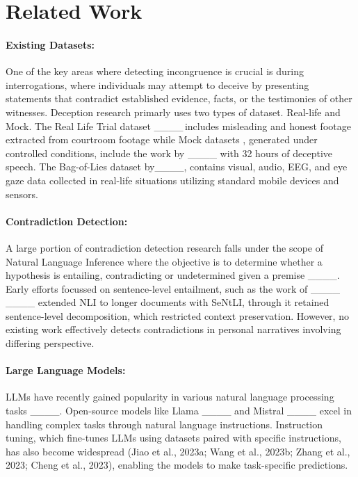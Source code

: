 \section{Related Work}
\paragraph{Existing Datasets:} One of the key areas where detecting incongruence is crucial is during interrogations, where individuals may attempt to deceive by presenting statements that contradict established evidence, facts, or the testimonies of other witnesses. Deception research primarly uses two types of dataset. Real-life and Mock. The Real Life Trial dataset ____\,includes misleading and honest footage extracted from courtroom footage while Mock datasets , generated under controlled conditions, include the work by ____ with 32 hours of deceptive speech.
The Bag-of-Lies dataset by____, contains visual, audio, EEG, and eye gaze data collected in real-life situations utilizing standard mobile devices and sensors.
\vspace{-0.3cm}
\paragraph{Contradiction Detection:} A large portion of contradiction detection research falls under the scope of Natural Language Inference where the objective is to determine whether a hypothesis is entailing, contradicting or undetermined given a premise ____. Early efforts focussed on sentence-level entailment, such as the work of ____ ____ extended NLI to longer documents with SeNtLI, through it retained sentence-level decomposition, which restricted context preservation.
However, no existing work effectively detects contradictions in personal narratives involving differing perspective.
\vspace{-0.3cm}
\paragraph{Large Language Models: } LLMs have recently gained popularity in various natural language processing tasks ____. Open-source models like Llama ____ and Mistral ____ excel in handling complex tasks through natural language instructions. Instruction tuning, which fine-tunes LLMs using datasets paired with specific instructions, has also become widespread (Jiao et al., 2023a; Wang et al., 2023b; Zhang et al., 2023; Cheng et al., 2023), enabling the models to make task-specific predictions.

